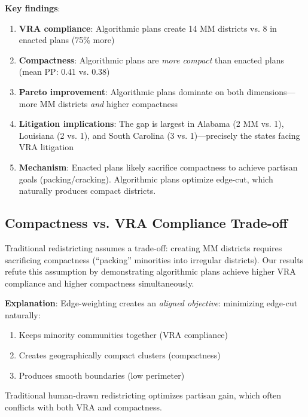 \textbf{Key findings}:
\begin{enumerate}
    \item \textbf{VRA compliance}: Algorithmic plans create 14 MM districts vs. 8 in enacted plans (75\% more)

    \item \textbf{Compactness}: Algorithmic plans are \textit{more compact} than enacted plans (mean PP: 0.41 vs. 0.38)

    \item \textbf{Pareto improvement}: Algorithmic plans dominate on both dimensions---more MM districts \textit{and} higher compactness

    \item \textbf{Litigation implications}: The gap is largest in Alabama (2 MM vs. 1), Louisiana (2 vs. 1), and South Carolina (3 vs. 1)---precisely the states facing VRA litigation~\cite{singleton2023,robinson2023,naacp2023}

    \item \textbf{Mechanism}: Enacted plans likely sacrifice compactness to achieve partisan goals (packing/cracking). Algorithmic plans optimize edge-cut, which naturally produces compact districts.
\end{enumerate}

\subsection{Compactness vs. VRA Compliance Trade-off}

Traditional redistricting assumes a trade-off: creating MM districts requires sacrificing compactness (``packing'' minorities into irregular districts). Our results refute this assumption by demonstrating algorithmic plans achieve higher VRA compliance and higher compactness simultaneously.

\textbf{Explanation}: Edge-weighting creates an \textit{aligned objective}: minimizing edge-cut naturally:
\begin{enumerate}
    \item Keeps minority communities together (VRA compliance)
    \item Creates geographically compact clusters (compactness)
    \item Produces smooth boundaries (low perimeter)
\end{enumerate}

Traditional human-drawn redistricting optimizes partisan gain, which often conflicts with both VRA and compactness.

